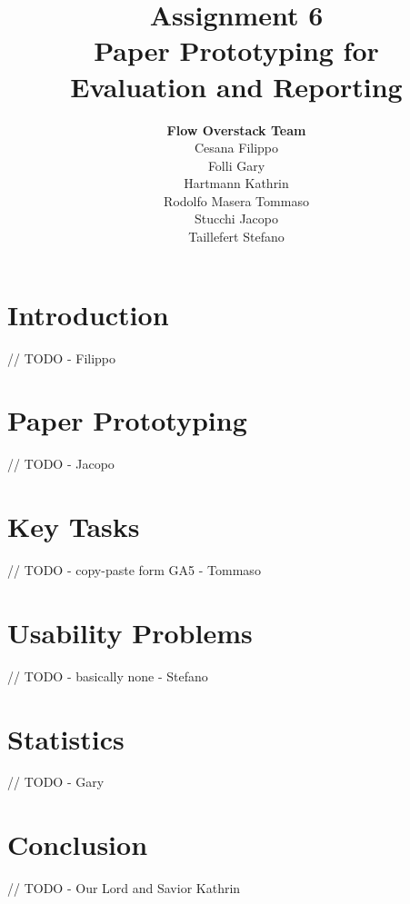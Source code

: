 \documentclass[12pt]{scrartcl}
\title{Assignment 6\\ Paper Prototyping for\\ Evaluation and Reporting}
\author{\textbf{Flow Overstack Team}\\ Cesana Filippo\\ Folli Gary\\ Hartmann Kathrin\\ Rodolfo Masera Tommaso\\ Stucchi Jacopo\\ Taillefert Stefano}
\date{}
\begin{document}
\maketitle

\tableofcontents

\newpage

\section{Introduction}

	
	// TODO - Filippo
	
	
\section{Paper Prototyping}

	
	// TODO - Jacopo
	
	
\section{Key Tasks}

	
	// TODO - copy-paste form GA5 - Tommaso
	

\section{Usability Problems}

	
	// TODO - basically none - Stefano
	
	
\section{Statistics}


	// TODO - Gary
	
	
\section{Conclusion}

	
	// TODO - Our Lord and Savior Kathrin
	
	
\end{document}
